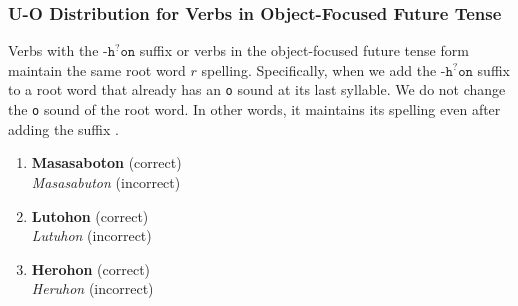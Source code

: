 \subsubsection{U-O Distribution for Verbs in Object-Focused Future Tense}

Verbs with the $\texttt{-h}^?\texttt{on}$ suffix or verbs in the object-focused future tense form maintain the same root word $r$ spelling. Specifically, when we add the $\texttt{-h}^?\texttt{on}$ suffix to a root word that already has an \texttt{o} sound at its last syllable. We do not change the \texttt{o} sound of the root word. In other words, it maintains its spelling even after adding the suffix \cite{bikol_dictionary}.

\begin{example}
\end{example}

\begin{enumerate}
      \item \textbf{Masasaboton} (correct) \\
            \textit{Masasabuton} (incorrect)
      \item \textbf{Lutohon} (correct) \\
            \textit{Lutuhon} (incorrect)
      \item \textbf{Herohon} (correct) \\
            \textit{Heruhon} (incorrect)
\end{enumerate}
